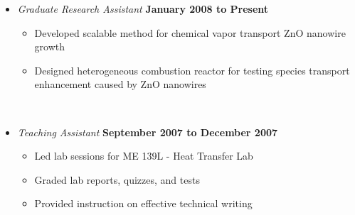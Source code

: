 \documentclass[line,margin]{res}
\begin{document}
\begin{resume}
\begin{itemize}
\item \textit{Graduate Research Assistant}%
  \hfill \textbf{January 2008 to Present}
  \begin{itemize}
  \item Developed scalable method for chemical vapor transport ZnO nanowire growth
  \item Designed heterogeneous combustion reactor for testing species transport enhancement
    caused by ZnO nanowires
  \end{itemize}~

\item \textit{Teaching Assistant}%
  \hfill \textbf{September 2007 to December 2007}
  \begin{itemize}
  \item Led lab sessions for ME 139L - Heat Transfer Lab
  \item Graded lab reports, quizzes, and tests
  \item Provided instruction on effective technical writing
  \end{itemize}
\end{itemize}

\end{resume}
\end{document}
